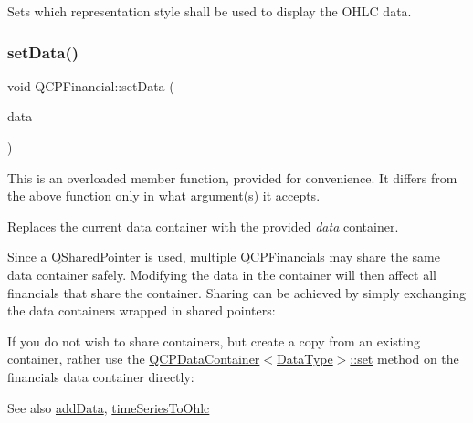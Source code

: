 Sets which representation style shall be used to display the O\+H\+LC data. \mbox{\label{class_q_c_p_financial_a72089e75b8a50d18097526c3c79fdb85}} 
\subsubsection{\texorpdfstring{setData()}{setData()}\hspace{0.1cm}{\footnotesize\ttfamily [1/2]}}
{\footnotesize\ttfamily void Q\+C\+P\+Financial\+::set\+Data (\begin{DoxyParamCaption}\item[{Q\+Shared\+Pointer$<$ \mbox{\hyperlink{qcustomplot_8h_ae36e482e04f19a54782f01ab38c354a6}{Q\+C\+P\+Financial\+Data\+Container}} $>$}]{data }\end{DoxyParamCaption})}

This is an overloaded member function, provided for convenience. It differs from the above function only in what argument(s) it accepts.

Replaces the current data container with the provided {\itshape data} container.

Since a Q\+Shared\+Pointer is used, multiple Q\+C\+P\+Financials may share the same data container safely. Modifying the data in the container will then affect all financials that share the container. Sharing can be achieved by simply exchanging the data containers wrapped in shared pointers\+: 
\begin{DoxyCodeInclude}{0}
\end{DoxyCodeInclude}
 If you do not wish to share containers, but create a copy from an existing container, rather use the \mbox{\hyperlink{class_q_c_p_data_container_ae7042bd534fc3ce7befa2ce3f790b5bf}{Q\+C\+P\+Data\+Container$<$\+Data\+Type$>$\+::set}} method on the financial\textquotesingle{}s data container directly\+: 
\begin{DoxyCodeInclude}{0}
\end{DoxyCodeInclude}
 \begin{DoxySeeAlso}{See also}
\mbox{\hyperlink{class_q_c_p_financial_a372ac031e44a7a6c912d203556af96f7}{add\+Data}}, \mbox{\hyperlink{class_q_c_p_financial_a9a058c035040d3939b8884f4aaccb1a7}{time\+Series\+To\+Ohlc}} 
\end{DoxySeeAlso}
\mbox{\label{class_q_c_p_financial_a12992e669ed19d7bb48dbe601570cc05}} 
